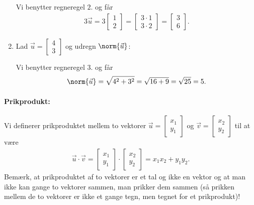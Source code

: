 \begin{enumerate}
Vi benytter regneregel $2$. og får
\begin{align*}
3\vec{u} = 3\begin{bmatrix} 1 \\ 2 \end{bmatrix} = \begin{bmatrix} 3\cdot 1 \\ 3 \cdot 2 \end{bmatrix}  = \begin{bmatrix} 3 \\ 6 \end{bmatrix}. 
\end{align*}
\item Lad $\vec{u}= \begin{bmatrix} 4 \\ 3 \end{bmatrix}$ og udregn $\norm{\vec{u}}$:

Vi benytter regneregel $3.$ og får
\begin{align*}
\norm{\vec{u}} = \sqrt{4^2+3^2} = \sqrt{16+9}= \sqrt{25}=5.
\end{align*}
\end{enumerate}

\paragraph*{Prikprodukt:}
Vi definerer prikproduktet mellem to vektorer $\vec{u} = \begin{bmatrix} x_1 \\ y_1 \end{bmatrix}$ og $\vec{v} = \begin{bmatrix} x_2 \\ y_2 \end{bmatrix}$ til at være
\begin{align}\label{eq:vec2d1prikprodukt}
\vec{u} \cdot \vec{v} =\begin{bmatrix} x_1 \\ y_1 \end{bmatrix} \cdot \begin{bmatrix} x_2 \\ y_2 \end{bmatrix} = x_1 x_2 + y_1  y_2.
\end{align}
Bemærk, at prikproduktet af to vektorer er et tal og ikke en vektor og at man ikke kan gange to vektorer sammen, man prikker dem sammen (så prikken mellem de to vektorer er ikke et gange tegn, men tegnet for et prikprodukt)!

